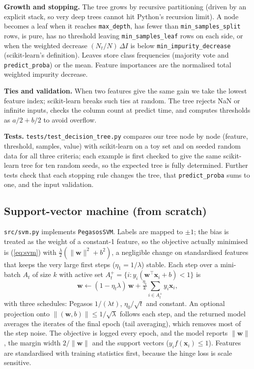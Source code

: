 \documentclass[10pt,twocolumn,a4paper]{article}
\newcommand{\code}[1]{\texttt{#1}}
\begin{document}
\textbf{Growth and stopping.} The tree grows by recursive partitioning
(driven by an explicit stack, so very deep trees cannot hit Python's
recursion limit). A node becomes a leaf when it reaches
\code{max\_depth}, has fewer than \code{min\_samples\_split} rows, is pure,
has no threshold leaving \code{min\_samples\_leaf} rows on each side, or
when the weighted decrease $(N_t/N)\,\Delta I$ is below
\code{min\_impurity\_decrease} (scikit-learn's definition). Leaves store
class frequencies (majority vote and \code{predict\_proba}) or the mean.
Feature importances are the normalised total weighted impurity decrease.

\textbf{Ties and validation.} When two features give the same gain we take
the lowest feature index; scikit-learn breaks such ties at random. The
tree rejects NaN or infinite inputs, checks the column count at predict
time, and computes thresholds as $a/2+b/2$ to avoid overflow.

\textbf{Tests.} \code{tests/test\_decision\_tree.py} compares our tree node
by node (feature, threshold, samples, value) with scikit-learn on a toy
set and on seeded random data for all three criteria; each example is
first checked to give the same scikit-learn tree for ten random seeds, so
the expected tree is fully determined. Further tests check that each
stopping rule changes the tree, that \code{predict\_proba} sums to one, and
the input validation.

\subsection{Support-vector machine (from scratch)}
\code{src/svm.py} implements \code{PegasosSVM}. Labels are mapped to
$\pm1$; the bias is treated as the weight of a constant-1 feature, so the
objective actually minimised is (\ref{eq:svm}) with
$\tfrac{\lambda}{2}(\lVert\mathbf{w}\rVert^2+b^2)$, a negligible change
on standardised features that keeps the very large first steps
($\eta_1 = 1/\lambda$) stable. Each step over a mini-batch $A_t$ of size
$k$ with active set $A_t^+=\{i: y_i(\mathbf{w}^\top\mathbf{x}_i+b)<1\}$ is
\begin{equation}
  \mathbf{w} \leftarrow (1-\eta_t\lambda)\,\mathbf{w}
  + \tfrac{\eta_t}{k}\textstyle\sum_{i\in A_t^+} y_i\mathbf{x}_i ,
\end{equation}
with three schedules: Pegasos $1/(\lambda t)$, $\eta_0/\sqrt{t}$ and
constant. An optional projection onto $\lVert(\mathbf{w},b)\rVert\le
1/\sqrt{\lambda}$ follows each step, and the returned model averages the
iterates of the final epoch (tail averaging), which removes most of the
step noise. The objective is logged every epoch, and the model reports
$\lVert\mathbf{w}\rVert$, the margin width $2/\lVert\mathbf{w}\rVert$ and
the support vectors ($y_i f(\mathbf{x}_i)\le1$). Features are
standardised with training statistics first, because the hinge loss is
scale sensitive.
\end{document}
